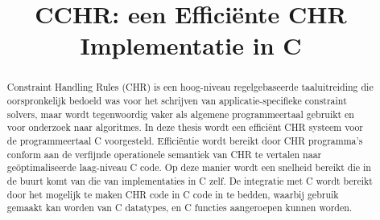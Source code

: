 \documentclass[12pt]{article}
\title{CCHR: een Effici\"ente CHR Implementatie in C}
\begin{document}
\begin{coverpage} 

% 
% 
% 
% 
%  

\begin{abstract}
Constraint Handling Rules (CHR) is een hoog-niveau regelgebaseerde taaluitreiding die oorspronkelijk bedoeld was voor het schrijven van applicatie-specifieke constraint solvers, maar wordt tegenwoordig vaker als algemene programmeertaal gebruikt en voor onderzoek naar algoritmes. In deze thesis wordt een effici\"ent CHR systeem voor de programmeertaal C voorgesteld. Effici\"entie wordt bereikt door CHR programma's conform aan de verfijnde operationele semantiek van CHR te vertalen naar ge\"optimaliseerde laag-niveau C code. Op deze manier wordt een snelheid bereikt die in de buurt komt van die van implementaties in C zelf. De integratie met C wordt bereikt door het mogelijk te maken CHR code in C code in te bedden, waarbij gebruik gemaakt kan worden van C datatypes, en C functies aangeroepen kunnen worden. 
\end{abstract}

\end{coverpage}		%
\end{document}
